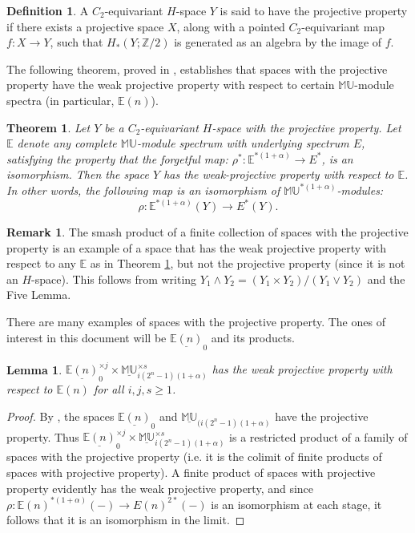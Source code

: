 \documentclass[12pt]{amsart}
\numberwithin{equation}{section}
\theoremstyle{plain}  %
\newtheorem{thm}[equation]{Theorem}
\newtheorem{lemma}[equation]{Lemma}
\theoremstyle{definition}  %
\newtheorem{defn}[equation]{Definition}
\newtheorem{remark}[equation]{Remark}
\newcommand{\ZZ}{\mathbb{Z}}
\newcommand{\ER}{\mathbb{E}}
\newcommand{\MU}{\mathbb {MU}}
\newcommand{\E}{\mathbb{E}}
\renewcommand{\sp}[2]{\underline{#1}_{#2}}
\begin{document}
\medskip
\begin{defn} A $C_2$-equivariant $H$-space $Y$ is said to have the projective 
property if there exists a projective space $X$, along 
with a pointed $C_2$-equivariant map $f : X \longrightarrow Y$, 
such that $H_*(Y;\ZZ/2)$ is generated as an algebra by the image of $f$.
\end{defn} 

The following theorem, proved in \cite[Theorem 2.6]{KLW16a}, establishes that spaces with the projective property have the weak projective property with respect to certain $\MU$-module spectra (in particular, $\ER(n)$).

\medskip
\begin{thm} \label{thm:weakproj}
Let $Y$ be a $C_2$-equivariant $H$-space with the projective property. Let $\ER$ denote any complete $\MU$-module spectrum with underlying spectrum $E$, satisfying the property that the forgetful map: $\rho^\ast : \ER^{\ast(1+\alpha)} \longrightarrow E^\ast$, is an isomorphism. Then the space $Y$ has the weak-projective property with respect to $\ER$. In other words, the following map is an isomorphism of $\MU^{\ast(1+\alpha)}$-modules: 
\[ \rho : \ER^{\ast(1+\alpha)}(Y) \longrightarrow E^{\ast}(Y). \]
\end{thm}

\medskip
\begin{remark}\label{smashproj}
The smash product of a finite collection of spaces with the projective property is an example of a space that has the weak projective property with respect to any $\E$ as in Theorem \ref{thm:weakproj}, but not the projective property (since it is not an $H$-space). This follows from writing $Y_1 \wedge Y_2=(Y_1 \times Y_2)/(Y_1 \vee Y_2)$ and the Five Lemma.
\end{remark}

\medskip
\noindent
There are many examples of spaces with the projective property. The ones of interest in this document will be $\underline{\ER(n)}_0$ and its products. 

\medskip
\begin{lemma}\label{zeroproj} $\underline{\E(n)}_0^{\times j} \times \underline{\MU}_{i(2^n-1)(1+\alpha)}^{\times s}$ has the weak projective property with respect to $\E(n)$ for all $i, j, s \geq 1$.
\end{lemma}
\begin{proof} By \cite[Theorem 1-4]{KW13}, the spaces $\sp{\E(n)}{0}$ and $\sp{\MU}{(i(2^n-1)(1+\alpha)}$ have the projective property.  Thus $\sp{\E(n)}{0}^{\times j} \times \underline{\MU}_{i(2^n-1)(1+\alpha)}^{\times s}$ is a restricted product of a family of spaces with the projective property (i.e. it is the colimit of finite products of spaces with projective property). A finite product of spaces with projective property evidently has the weak projective property, and since $\rho: \E(n)^{*(1+\alpha)}(-) \longrightarrow E(n)^{2*}(-)$ is an isomorphism at each stage, it follows that it is an isomorphism in the limit.
\end{proof}
\end{document}
